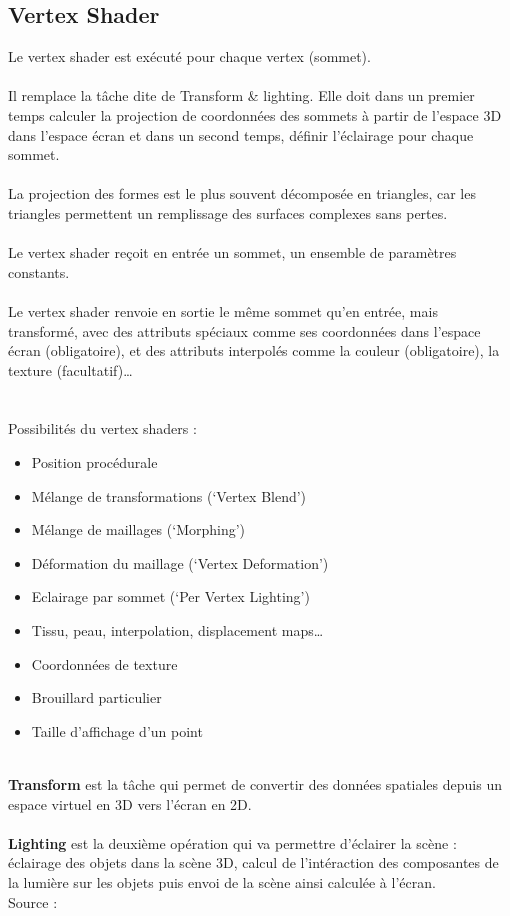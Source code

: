 \subsection{Vertex Shader}
Le vertex shader est exécuté pour chaque vertex (sommet).
\\\\
Il remplace la tâche dite de Transform \& lighting. Elle doit dans un premier temps calculer la projection de coordonnées des sommets à partir de l'espace 3D dans l'espace écran et dans un second temps, définir l’éclairage pour chaque sommet.
\\\\
La projection des formes est le plus souvent décomposée en triangles, car les triangles permettent un remplissage des surfaces complexes sans pertes.
\\\\
Le vertex shader reçoit en entrée un sommet, un ensemble  de paramètres constants.
\\\\
Le vertex shader renvoie en sortie le même sommet qu’en entrée, mais transformé, avec des attributs spéciaux comme ses coordonnées dans l’espace écran (obligatoire), et des attributs interpolés comme la couleur (obligatoire), la texture (facultatif)…
\\\\\\
Possibilités du vertex shaders :
\begin{itemize}
  \item Position procédurale
  \item Mélange de transformations (‘Vertex Blend’)
  \item Mélange de maillages (‘Morphing’) 
  \item Déformation du maillage (‘Vertex Deformation’)
  \item Eclairage par sommet (‘Per Vertex Lighting’)
  \item Tissu, peau, interpolation, displacement maps…
  \item Coordonnées de texture
  \item Brouillard particulier
  \item Taille d’affichage d’un point
  
\end{itemize} 

\textbf{\\Transform} est la tâche qui permet de convertir des données spatiales depuis un espace virtuel en 3D vers l'écran en 2D.
\\\\
\textbf{Lighting} est la deuxième opération qui va permettre d'éclairer la scène : éclairage des objets dans la scène 3D, calcul de l'intéraction des composantes de la lumière sur les objets puis envoi de la scène ainsi calculée à l'écran.
\\
Source : \cite{shader4}
\newpage

